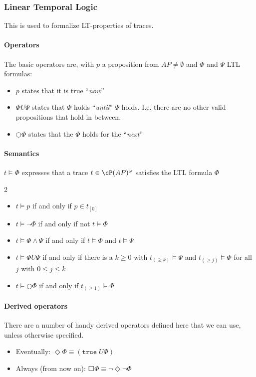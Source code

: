 \subsubsection{Linear Temporal Logic}
This is used to formalize LT-properties of traces.

\paragraph{Operators}
The basic operators are, with $p$ a proposition from $AP \neq \emptyset$ and $\Phi$ and $\Psi$ LTL formulas:
\begin{itemize}
    \item $p$ states that it is true ``\textit{now}''
    \item $\Phi U \Psi$ states that $\Phi$ holds ``\textit{until}'' $\Psi$ holds. I.e. there are no other valid propositions that hold in between.
    \item $\bigcirc \Phi$ states that the $\Phi$ holds for the ``\textit{next}''
\end{itemize}


\paragraph{Semantics}
$t \models \Phi$ expresses that a trace $t \in \cP(AP)^\omega$ satisfies the LTL formula $\Phi$
\begin{multicols}{2}
    \begin{itemize}
        \item $t \models p$ if and only if $p \in t_{[0]}$
        \item $t \models \neg \Phi$ if and only if not $t \models \Phi$
        \item $t \models \Phi \land \Psi$ if and only if $t \models \Phi$ and $t \models \Psi$
        \item $t \models \Phi U \Psi$ if and only if there is a $k \geq 0$ with $t_{(\geq k)} \models \Psi$ and $t_{(\geq j)} \models \Phi$ for all $j$ with $0 \leq j \leq k$
        \item $t \models \bigcirc \Phi$ if and only if $t_{(\geq 1)} \models \Phi$
    \end{itemize}
\end{multicols}


\paragraph{Derived operators}
There are a number of handy derived operators defined here that we can use, unless otherwise specified.
\begin{itemize}
    \item Eventually: $\Diamond \Phi \equiv (\texttt{true}\; U \Phi)$
    \item Always (from now on): $\Square \Phi \equiv \neg \Diamond \neg \Phi$
\end{itemize}

